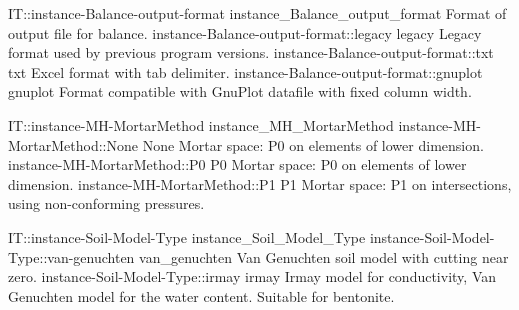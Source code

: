 \begin{SelectionType}
	{IT::instance-Balance-output-format}
	{instance{\_}Balance{\_}output{\_}format}
	{{{Format of output file for balance.}%
}}
		\SelectionItem
			{instance-Balance-output-format::legacy}
			{legacy}
			{{{Legacy format used by previous program versions.}%
}}
		\SelectionItem
			{instance-Balance-output-format::txt}
			{txt}
			{{{Excel format with tab delimiter.}%
}}
		\SelectionItem
			{instance-Balance-output-format::gnuplot}
			{gnuplot}
			{{{Format compatible with GnuPlot datafile with fixed column width.}%
}}
\end{SelectionType}
\begin{SelectionType}
	{IT::instance-MH-MortarMethod}
	{instance{\_}MH{\_}MortarMethod}
	{}
		\SelectionItem
			{instance-MH-MortarMethod::None}
			{None}
			{{{Mortar space: P0 on elements of lower dimension.}%
}}
		\SelectionItem
			{instance-MH-MortarMethod::P0}
			{P0}
			{{{Mortar space: P0 on elements of lower dimension.}%
}}
		\SelectionItem
			{instance-MH-MortarMethod::P1}
			{P1}
			{{{Mortar space: P1 on intersections, using non-conforming pressures.}%
}}
\end{SelectionType}
\begin{SelectionType}
	{IT::instance-Soil-Model-Type}
	{instance{\_}Soil{\_}Model{\_}Type}
	{}
		\SelectionItem
			{instance-Soil-Model-Type::van-genuchten}
			{van{\_}genuchten}
			{{{Van Genuchten soil model with cutting near zero.}%
}}
		\SelectionItem
			{instance-Soil-Model-Type::irmay}
			{irmay}
			{{{Irmay model for conductivity, Van Genuchten model for the water content.
Suitable for bentonite.}%
}}
\end{SelectionType}
